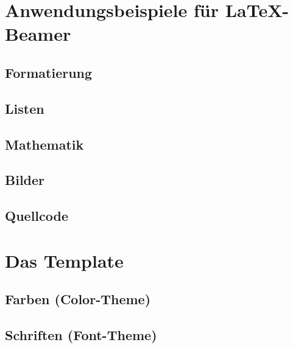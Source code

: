 \begingroup
\tucthreeheadlines
\frame{\titlepage}
\endgroup




\section{Anwendungsbeispiele für \LaTeX-Beamer}
\subsection{Formatierung}



\subsection{Listen}


\subsection{Mathematik}


\subsection{Bilder}


\subsection{Quellcode}



\section{Das Template}


\subsection{Farben (Color-Theme)}


\subsection{Schriften (Font-Theme)}


